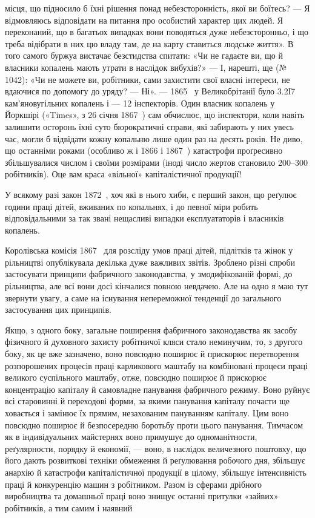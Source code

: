 \parcont{}  %
місця, що підносило б їхні рішення понад небезсторонність, якої
ви боїтесь? — Я відмовляюсь відповідати на питання про особистий
характер цих людей. Я переконаний, що в багатьох випадках
вони поводяться дуже небезсторонньо, і що треба відібрати
в них цю владу там, де на карту ставиться людське життя».
В того самого буржуа вистачає безстидства спитати: «Чи не гадаєте
ви, що й власники копалень мають утрати в наслідок вибухів?»
— І, нарешті, ще (№ 1042): «Чи не можете ви, робітники,
сами захистити свої власні інтереси, не вдаючися по допомогу
до уряду? — Ні». — 1865~ у Великобрітанії було 3.2І7 кам’яновугільних
копалень і — 12 інспекторів. Один власник копалень
у Йоркшірі («Times», з 26 січня 1867~) сам обчислює, що
інспектори, коли навіть залишити осторонь їхні суто бюрократичні
справи, які забирають у них увесь час, могли б відвідати
кожну копальню лише один раз на десять років. Не диво, що
останніми роками (особливо ж і 1866 і 1867~) катастрофи проґресивно
збільшувалися числом і своїми розмірами (іноді число
жертов становило 200--300 робітників). Оце вам краса «вільної»
капіталістичної продукції!

У всякому разі закон 1872~, хоч які в нього хиби, є перший
закон, що реґулює години праці дітей, вживаних по копальнях,
і до певної міри робить відповідальними за так звані нещасливі
випадки експлуататорів і власників копалень.

Королівська комісія 1867~ для розсліду умов праці дітей,
підлітків та жінок у рільництві опублікувала декілька дуже
важливих звітів. Зроблено різні спроби застосувати принципи
фабричного законодавства, у змодифікованій формі, до рільництва,
але всі вони досі кінчалися повною невдачею. Але на одно
я маю тут звернути увагу, а саме на існування непереможної
тенденції до загального застосування цих принципів.

Якщо, з одного боку, загальне поширення фабричного законодавства
як засобу фізичного й духовного захисту робітничої
кляси стало неминучим, то, з другого боку, як це вже зазначено,
воно повсюдно поширює й прискорює перетворення розпорошених
процесів праці карликового маштабу на комбіновані процеси
праці великого суспільного маштабу, отже, повсюдно поширює
й прискорює концентрацію капіталу й самовладне панування
фабричного режиму. Воно руйнує всі старовинні й переходові
форми, за якими панування капіталу почасти ще ховається і
замінює їх прямим, незахованим пануванням капіталу. Цим
воно повсюдно поширює й безпосередню боротьбу проти цього
панування. Тимчасом як в індивідуальних майстернях воно примушує
до одноманітности, реґулярности, порядку й економії, —
воно, в наслідок величезного поштовху, що його дають розвиткові
техніки обмеження й реґулювання робочого дня, збільшує
анархію й катастрофи капіталістичної продукції в цілому, збільшує
інтенсивність праці й конкуренцію машин з робітником. Разом
із сферами дрібного виробництва та домашньої праці воно знищує
останні притулки «зайвих» робітників, а тим самим і наявний
\parbreak{}  %
